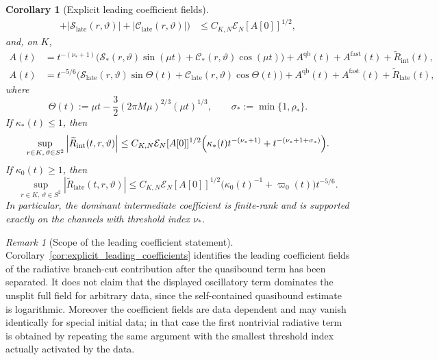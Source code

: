 \documentclass[12pt]{article}
\numberwithin{equation}{section}
\theoremstyle{plain}
\newtheorem{corollary}[theorem]{Corollary}
\theoremstyle{definition}
\theoremstyle{remark}
\newtheorem{remark}{Remark}[section]
\newcommand{\qb}{\mathrm{qb}}
\newcommand{\fast}{\mathrm{fast}}
\newcommand{\cC}{\mathcal C}
\newcommand{\cS}{\mathcal S}
\newcommand{\vp}{\varpi}
\newcommand{\kap}{\kappa}
\newcommand{\abs}[1]{\left|#1\right|}
\begin{document}
\begin{corollary}[Explicit leading coefficient fields]
\begin{align}
      +\abs{\cS_{\mathrm{late}}(r,\vartheta)}
      +\abs{\cC_{\mathrm{late}}(r,\vartheta)}
   \Bigr)
   &\le
   C_{K,N}\mathcal E_N[A[0]]^{1/2},
   \label{eq:intro_explicit_coeff_bound}
\end{align}
and, on $K$,
\begin{align}
   A(t)
   &=
   t^{-(\nu_*+1)}
   \bigl(
      \cS_*(r,\vartheta)\sin(\mu t)
      +
      \cC_*(r,\vartheta)\cos(\mu t)
   \bigr)
   +A^{\qb}(t)+A^{\fast}(t)+\widetilde R_{\mathrm{int}}(t),
   \label{eq:intro_explicit_intermediate_coeff}
   \\
   A(t)
   &=
   t^{-5/6}
   \bigl(
      \cS_{\mathrm{late}}(r,\vartheta)\sin\Theta(t)
      +
      \cC_{\mathrm{late}}(r,\vartheta)\cos\Theta(t)
   \bigr)
   +A^{\qb}(t)+A^{\fast}(t)+\widetilde R_{\mathrm{late}}(t),
   \label{eq:intro_explicit_late_coeff}
\end{align}
where
\[
   \Theta(t):=\mu t-\frac32(2\pi M\mu)^{2/3}(\mu t)^{1/3},
   \qquad
   \sigma_*:=\min\{1,\rho_*\}.
\]
If $\kap_*(t)\le1$, then
\begin{equation}\label{eq:intro_explicit_intermediate_remainder}
   \sup_{r\in K,\,\vartheta\in S^2}
   \abs{\widetilde R_{\mathrm{int}}(t,r,\vartheta)}
   \le
   C_{K,N}\mathcal E_N[A[0]]^{1/2}
   \Bigl(
      \kap_*(t)t^{-(\nu_*+1)}
      +
      t^{-(\nu_*+1+\sigma_*)}
   \Bigr).
\end{equation}
If $\kap_0(t)\ge1$, then
\begin{equation}\label{eq:intro_explicit_late_remainder}
   \sup_{r\in K,\,\vartheta\in S^2}
   \abs{\widetilde R_{\mathrm{late}}(t,r,\vartheta)}
   \le
   C_{K,N}\mathcal E_N[A[0]]^{1/2}
   \bigl(\kap_0(t)^{-1}+\vp_0(t)\bigr)t^{-5/6}.
\end{equation}
In particular, the dominant intermediate coefficient is finite-rank and is supported exactly on the channels with threshold index $\nu_*$.
\end{corollary}

\begin{remark}[Scope of the leading coefficient statement]\label{rem:leading_coefficient_scope}
Corollary~\ref{cor:explicit_leading_coefficients} identifies the leading coefficient fields of the radiative branch-cut contribution after the quasibound term has been separated.  It does not claim that the displayed oscillatory term dominates the unsplit full field for arbitrary data, since the self-contained quasibound estimate is logarithmic.  Moreover the coefficient fields are data dependent and may vanish identically for special initial data; in that case the first nontrivial radiative term is obtained by repeating the same argument with the smallest threshold index actually activated by the data.
\end{remark}
\end{document}
